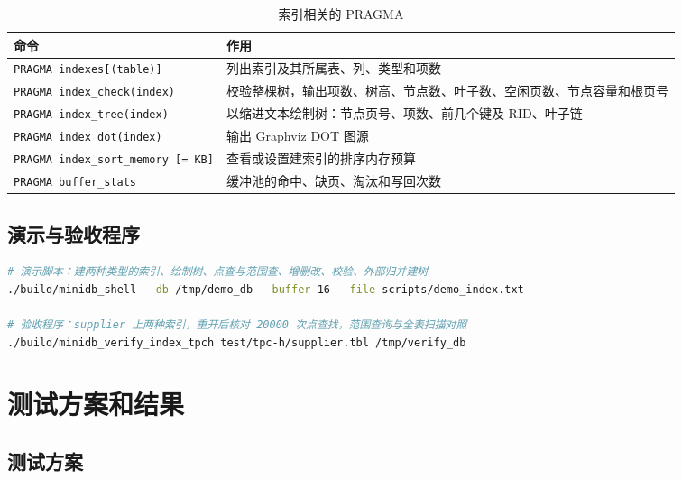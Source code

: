 \documentclass[11pt,a4paper]{ctexart}
\newcommand{\code}[1]{\texttt{#1}}
\begin{document}
\begin{table}[H]
  \centering
  \caption{索引相关的 PRAGMA}
  \begin{tabularx}{\textwidth}{l X}
    \toprule
    命令 & 作用 \\
    \midrule
    \code{PRAGMA indexes[(table)]} & 列出索引及其所属表、列、类型和项数 \\
    \code{PRAGMA index\_check(index)} & 校验整棵树，输出项数、树高、节点数、叶子数、空闲页数、节点容量和根页号 \\
    \code{PRAGMA index\_tree(index)} & 以缩进文本绘制树：节点页号、项数、前几个键及 RID、叶子链 \\
    \code{PRAGMA index\_dot(index)} & 输出 Graphviz DOT 图源 \\
    \code{PRAGMA index\_sort\_memory [= KB]} & 查看或设置建索引的排序内存预算 \\
    \code{PRAGMA buffer\_stats} & 缓冲池的命中、缺页、淘汰和写回次数 \\
    \bottomrule
  \end{tabularx}
\end{table}

\subsection{演示与验收程序}

\begin{lstlisting}[language=bash,style=plain]
# 演示脚本：建两种类型的索引、绘制树、点查与范围查、增删改、校验、外部归并建树
./build/minidb_shell --db /tmp/demo_db --buffer 16 --file scripts/demo_index.txt

# 验收程序：supplier 上两种索引，重开后核对 20000 次点查找，范围查询与全表扫描对照
./build/minidb_verify_index_tpch test/tpc-h/supplier.tbl /tmp/verify_db
\end{lstlisting}

\section{测试方案和结果}

\subsection{测试方案}
\end{document}
